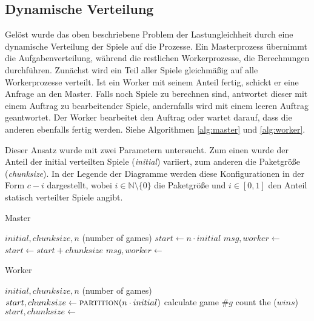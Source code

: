 \subsection{Dynamische Verteilung}

Gelöst wurde das oben beschriebene Problem der Lastungleichheit durch eine
dynamische Verteilung der Spiele auf die Prozesse.  Ein Masterprozess übernimmt
die Aufgabenverteilung, während die restlichen Workerprozesse, die Berechnungen
durchführen.  Zunächst wird ein Teil aller Spiele gleichmäßig auf alle
Workerprozesse verteilt. Ist ein Worker mit seinem Anteil fertig, schickt er
eine Anfrage an den Master. Falls noch Spiele zu berechnen sind, antwortet
dieser mit einem Auftrag zu bearbeitender Spiele, andernfalls wird mit einem
leeren Auftrag geantwortet.  Der Worker bearbeitet den Auftrag oder wartet
darauf, dass die anderen ebenfalls fertig werden.  Siehe Algorithmen
\ref{alg:master} und \ref{alg:worker}.

Dieser Ansatz wurde mit zwei Parametern untersucht. Zum
einen wurde der Anteil der initial verteilten Spiele (\emph{initial}) variiert,
zum anderen die Paketgröße (\emph{chunksize}). In der Legende der Diagramme
werden diese Konfigurationen in der Form $c-i$ dargestellt, wobei $i \in
\mathbb{N} \setminus \{0\}$ die Paketgröße und $i \in [0, 1]$ den Anteil
statisch verteilter Spiele angibt.

\begin{algorithm}
    \caption{Master}
    \label{alg:master}
    \begin{algorithmic}[1]
        \Require $initial, chunksize, n$ (number of games)
        \State $start \gets n \cdot initial$
            \State $msg, worker \gets $
            \State {}
            \State $start \gets start + chunksize$
        \EndWhile
            \State $msg, worker \gets $
            \State {}
        \EndFor
    \end{algorithmic}
\end{algorithm}
\begin{algorithm}
    \caption{Worker}
    \label{alg:worker}
    \begin{algorithmic}[1]
        \Require $initial, chunksize, n$ (number of games)
        \State $start, chunksize \gets \Call{partition}{n \cdot initial}$
            \For {$g \in [start, start + chunksize)$}
                \State calculate game $\#g$
                \State count the ($wins$)
            \EndFor
            \State {}
            \State $start, chunksize \gets $
        \EndWhile
    \end{algorithmic}
\end{algorithm}

